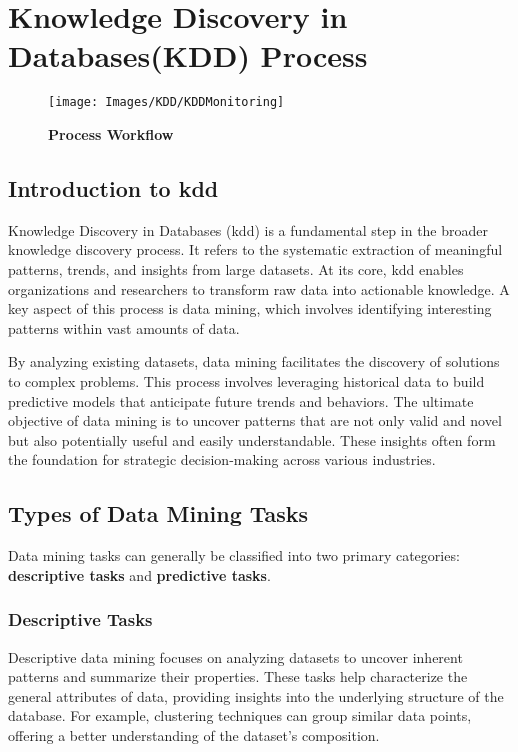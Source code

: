 %
%
\chapter{Knowledge Discovery in Databases(KDD) Process}

\begin{figure}[h!]
	
	\centering
	\texttt{[image: Images/KDD/KDDMonitoring]}
	\caption{\textbf{Process Workflow}}
	
\end{figure}

\section{Introduction to \ac{kdd}}

Knowledge Discovery in Databases (\ac{kdd}) is a fundamental step in the broader knowledge discovery process. It refers to the systematic extraction of meaningful patterns, trends, and insights from large datasets. At its core, \ac{kdd} enables organizations and researchers to transform raw data into actionable knowledge. A key aspect of this process is data mining, which involves identifying interesting patterns within vast amounts of data.

By analyzing existing datasets, data mining facilitates the discovery of solutions to complex problems. This process involves leveraging historical data to build predictive models that anticipate future trends and behaviors. The ultimate objective of data mining is to uncover patterns that are not only valid and novel but also potentially useful and easily understandable. These insights often form the foundation for strategic decision-making across various industries.

\section{Types of Data Mining Tasks}

Data mining tasks can generally be classified into two primary categories: \textbf{descriptive tasks} and \textbf{predictive tasks}.

\subsection{Descriptive Tasks}
Descriptive data mining focuses on analyzing datasets to uncover inherent patterns and summarize their properties. These tasks help characterize the general attributes of data, providing insights into the underlying structure of the database. For example, clustering techniques can group similar data points, offering a better understanding of the dataset's composition.

